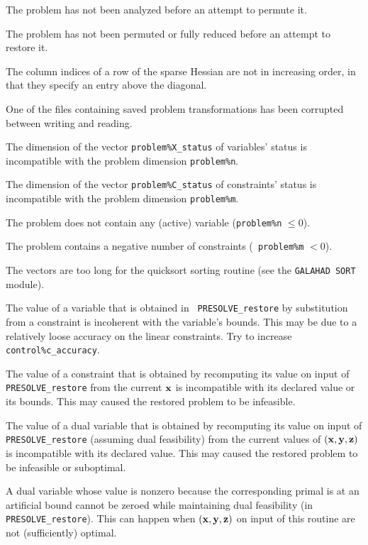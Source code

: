 \documentclass{galahad}
\newcommand{\packagename}{PRESOLVE}
\begin{document}
\begin{description}
 The problem has not been analyzed before an attempt to permute it.

 The problem has not been permuted or fully reduced 
before an attempt to restore it.

 The column indices of a row of the sparse Hessian are 
not in increasing order, in that they specify an entry above the diagonal.

 One of the files containing saved problem transformations has been
corrupted between  writing and reading.

 The dimension of the vector {\tt problem\%X\_status} of
variables' status is incompatible with the problem dimension {\tt problem\%n}.

 The dimension of the vector {\tt problem\%C\_status} of 
constraints' status is incompatible with the problem dimension
{\tt problem\%m}.

 The problem does not contain any (active) variable ({\tt problem\%n}
$\leq 0$).

 The problem contains a negative number of constraints ({\tt
problem\%m} $< 0$).

 The vectors are too long for the quicksort sorting routine (see the
{\tt GALAHAD SORT} module).

 The value of a variable that is obtained in {\tt
\packagename\_restore} by substitution from a constraint is incoherent with
the variable's bounds.  This may be due to a relatively loose accuracy on the
linear constraints. Try to increase {\tt control\%c\_accuracy}.

 The value of a constraint that is obtained by
recomputing its value on input of {\tt \packagename\_restore} from the
current ${\mathbf{x}}$ is incompatible with its declared value
or its bounds. This may caused the restored problem to be infeasible.

 The value of a dual variable that is obtained by
recomputing its value on input of {\tt \packagename\_restore} (assuming
dual feasibility) from the current values of $( {\mathbf{x}}, {\mathbf{y}}, {\mathbf{z}} )$ is
incompatible with its declared value. This may caused the restored problem to
be infeasible or suboptimal.

 A dual variable whose value is nonzero because the
corresponding primal is at an artificial bound cannot
be zeroed while maintaining dual feasibility 
(in {\tt \packagename\_restore}). This can happen when $( {\mathbf{x}}, {\mathbf{y}}, {\mathbf{z}} )$
on  input of this routine are not (sufficiently) optimal.


\end{description}
\end{document}

